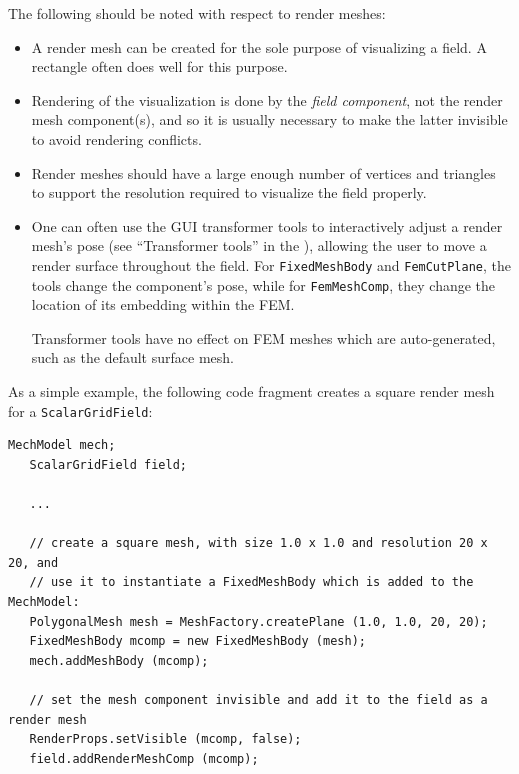 The following should be noted with respect to render meshes:

\begin{itemize}

\item A render mesh can be created for the sole
purpose of visualizing a field. A rectangle often does well for this
purpose.

\item Rendering of the visualization is done by the {\it field component},
not the render mesh component(s), and so it is usually necessary to
make the latter invisible to avoid rendering conflicts.

\item Render meshes should have a large enough number of vertices and triangles to
support the resolution required to visualize the field properly.

\item One can often use the GUI transformer tools
to interactively adjust a render mesh's pose (see ``Transformer
tools'' in the ), allowing the user to move a render surface throughout the
field.  For {\tt FixedMeshBody} and {\tt FemCutPlane}, the tools
change the component's pose, while for {\tt FemMeshComp}, they change the
location of its embedding within the FEM.

\begin{sideblock}
Transformer tools have no effect on FEM meshes which are
auto-generated, such as the default surface mesh.
\end{sideblock}

\end{itemize}

As a simple example, the following code fragment creates a square
render mesh for a {\tt ScalarGridField}:
%
\begin{lstlisting}[]
   MechModel mech;
   ScalarGridField field;

   ...

   // create a square mesh, with size 1.0 x 1.0 and resolution 20 x 20, and
   // use it to instantiate a FixedMeshBody which is added to the MechModel:
   PolygonalMesh mesh = MeshFactory.createPlane (1.0, 1.0, 20, 20);
   FixedMeshBody mcomp = new FixedMeshBody (mesh);
   mech.addMeshBody (mcomp);

   // set the mesh component invisible and add it to the field as a render mesh
   RenderProps.setVisible (mcomp, false);
   field.addRenderMeshComp (mcomp);
\end{lstlisting}
%

